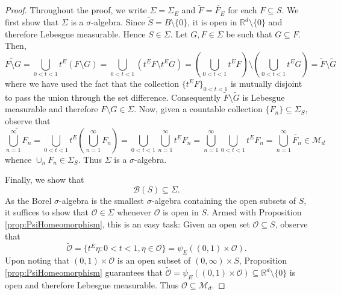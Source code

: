 \documentclass[11pt]{article}
\begin{document}
\begin{proof}
Throughout the proof, we write $\Sigma=\Sigma_{E}$ and $\widetilde{F}=\widetilde{F_E}$ for each $F\subseteq S$.
We first show that $\Sigma$ is a $\sigma$-algebra. Since $\widetilde S=B\setminus\{0\}$, it is open in $\mathbb{R}^d\setminus\{0\}$ and therefore Lebesgue measurable. Hence $S\in \Sigma$. Let $G, F\in \Sigma$ be such that $G\subseteq F$. Then,
\begin{equation*}
\widetilde{F\setminus G}=\bigcup_{0<t<1}t^E\left(F\setminus G\right)=\bigcup_{0<t<1}\left(t^EF\setminus t^E G\right)=\left(\bigcup_{0<t<1}t^E F\right)\setminus\left(\bigcup_{0<t<1}t^E G\right)=\widetilde F\setminus \widetilde G
\end{equation*}
where we have used the fact that the collection $\{t^E F\}_{0<t<1}$ is mutually disjoint to pass the union through the set difference. Consequently $\widetilde F\setminus \tilde{G}$ is Lebesgue measurable and therefore $F\setminus G\in \Sigma$.  Now, given a countable collection $\{F_n\}\subseteq \Sigma_S$, observe that
\begin{equation*}
    \widetilde{\bigcup_{n=1}^\infty F_n}= \bigcup_{0<t<1} t^E \left(\bigcup_{n=1}^\infty F_n\right)= \bigcup_{0 <t < 1}  \bigcup_{n=1}^\infty  t^E F_n =\bigcup_{n=1}^\infty \bigcup_{0 <t < 1}  t^E F_n =\bigcup_{n=1}^\infty \widetilde{F_n} \in \mathcal{M}_d
\end{equation*}
whence $\cup_n F_n\in \Sigma_S$. Thus $\Sigma$ is a $\sigma$-algebra. 

Finally, we show that
\begin{equation*}
\mathcal{B}(S)\subseteq\Sigma.
\end{equation*}
As the Borel $\sigma$-algebra is the smallest $\sigma$-algebra containing the open subsets of $S$, it suffices to show that $\mathcal{O}\in \Sigma$ whenever $\mathcal{O}$ is open in $S$. Armed with Proposition \ref{prop:PsiHomeomorphism}, this is an easy task: Given an open set $\mathcal{O}\subseteq S$, observe that
\begin{equation*}
\widetilde{\mathcal{O}}=\{t^E\eta:0<t<1,\eta\in\mathcal{O}\}=\psi_E((0,1)\times\mathcal{O}).
\end{equation*}
Upon noting that $(0,1)\times\mathcal{O}$ is an open subset of $(0,\infty)\times S$, Proposition \ref{prop:PsiHomeomorphism} guarantees that $\widetilde{\mathcal{O}}=\psi_E((0,1)\times\mathcal{O})\subseteq\mathbb{R}^d\setminus\{0\}$ is open and therefore Lebesgue measurable. Thus $\mathcal{O}\subseteq \mathcal{M}_d$.
\end{proof}
\end{document}
